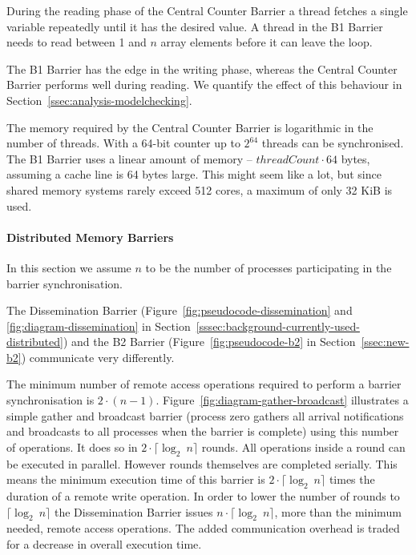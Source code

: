 \documentclass[a4paper, 10pt]{article}
\begin{document}
During the reading phase of the Central Counter Barrier a thread fetches a single variable repeatedly until it has the desired value. A thread in the B1 Barrier needs to read between 1 and $n$ array elements before it can leave the loop.

The B1 Barrier has the edge in the writing phase, whereas the Central Counter Barrier performs well during reading. We quantify the effect of this behaviour in Section~\ref{ssec:analysis-modelchecking}.

The memory required by the Central Counter Barrier is logarithmic in the number of threads. With a 64-bit counter up to $2^{64}$ threads can be synchronised. The B1 Barrier uses a linear amount of memory -- $\mathit{threadCount} \cdot 64$ bytes, assuming a cache line is 64 bytes large. This might seem like a lot, but since shared memory systems rarely exceed 512 cores, a maximum of only 32 KiB is used.

\paragraph{Distributed Memory Barriers}
\label{sssec:analysis-general-distributed}
In this section we assume $n$ to be the number of processes participating in the barrier synchronisation.

The Dissemination Barrier (Figure~\ref{fig:pseudocode-dissemination} and \ref{fig:diagram-dissemination} in Section~\ref{sssec:background-currently-used-distributed}) and the B2 Barrier (Figure~\ref{fig:pseudocode-b2} in Section~\ref{ssec:new-b2}) communicate very differently.

The minimum number of remote access operations required to perform a barrier synchronisation is $2 \cdot (n-1)$. Figure~\ref{fig:diagram-gather-broadcast} illustrates a simple gather and broadcast  barrier (process zero gathers all arrival notifications and broadcasts to all processes when the barrier is complete) using this number of operations. It does so in $2 \cdot  \lceil \log _2~n \rceil$ rounds. All operations inside a round can be executed in parallel. However rounds themselves are completed serially. This means the minimum execution time of this  barrier is $2 \cdot \lceil \log_2~n \rceil$ times the duration of a remote write operation. In order to lower the number of rounds to $\lceil \log _2~n \rceil$ the Dissemination Barrier issues $n \cdot \lceil \log _2~n \rceil$, more than the minimum needed, remote access operations. The added communication overhead is traded for a decrease in overall execution time.
\end{document}
